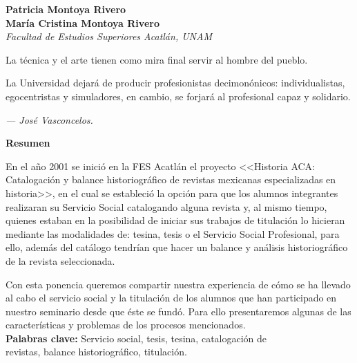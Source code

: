 \thispagestyle{empty}
{\par}
\setcounter{footnote}{0}

\bigskip
\begin{center}
{\bfseries Patricia Montoya Rivero\\
María Cristina Montoya Rivero}\\
{\itshape Facultad de Estudios Superiores Acatlán, UNAM}
\end{center}

\medskip
\epigraph{La técnica y el arte tienen  como mira final servir al hombre del pueblo.\par
La Universidad dejará de producir profesionistas decimonónicos: individualistas, egocentristas 
y simuladores, en cambio, se forjará al profesional capaz y solidario.}{\itshape — José Vasconcelos.}

\bigskip
\textbf{Resumen} 
\enlargethispage{1\baselineskip}

En el año  2001 se inició en la FES Acatlán el proyecto <<Historia ACA:
Catalogación y balance historiográfico de revistas mexicanas especializadas
en historia>>, en el cual se estableció la opción para que los alumnos
integrantes realizaran su Servicio Social catalogando alguna revista y, al
mismo tiempo, quienes estaban en la posibilidad de iniciar sus trabajos de
titulación lo hicieran mediante las modalidades de:  tesina, tesis o el
Servicio Social Profesional,  para ello, además del catálogo tendrían que
hacer un balance y análisis historiográfico de la revista  seleccionada. 

Con esta ponencia queremos compartir nuestra experiencia de cómo se ha
llevado al cabo el servicio social y la titulación de los alumnos que han
participado en nuestro seminario desde que éste se fundó.  Para ello
presentaremos algunas de las características y problemas de los procesos
mencionados.\\
\textbf{Palabras clave:} Servicio social, tesis, tesina, catalogación de\\
revistas, balance historiográfico, titulación.


